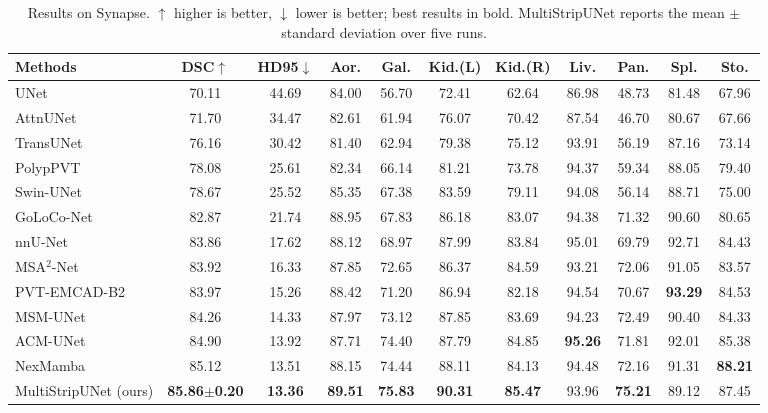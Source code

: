 \documentclass{llncs}
\begin{document}
\begin{table}[!htbp]
\centering
\scriptsize
\caption{Results on Synapse. $\uparrow$ higher is better, $\downarrow$ lower is better; best results in bold. MultiStripUNet reports the mean $\pm$ standard deviation over five runs.}
\label{table1}
\setlength{\tabcolsep}{3.5pt}
\begin{tabular}{l|cc|cccccccc}
\hline
Methods & DSC$\uparrow$ & HD95$\downarrow$ & Aor. & Gal. & Kid.(L) & Kid.(R) & Liv. & Pan. & Spl. & Sto. \\
\hline
UNet         \cite{ronneberger2015unet} & 70.11 & 44.69 & 84.00 & 56.70 & 72.41 & 62.64 & 86.98 & 48.73 & 81.48 & 67.96 \\
AttnUNet     \cite{oktay2018attention}  & 71.70 & 34.47 & 82.61 & 61.94 & 76.07 & 70.42 & 87.54 & 46.70 & 80.67 & 67.66 \\
TransUNet    \cite{chen2021transunet}  & 76.16 & 30.42 & 81.40 & 62.94 & 79.38 & 75.12 & 93.91 & 56.19 & 87.16 & 73.14 \\
PolypPVT     \cite{dong2021polyp}      & 78.08 & 25.61 & 82.34 & 66.14 & 81.21 & 73.78 & 94.37 & 59.34 & 88.05 & 79.40 \\
Swin-UNet    \cite{cao2021swinunet}    & 78.67 & 25.52 & 85.35 & 67.38 & 83.59 & 79.11 & 94.08 & 56.14 & 88.71 & 75.00 \\
GoLoCo-Net   \cite{goloco2026}         & 82.87 & 21.74 & 88.95 & 67.83 & 86.18 & 83.07 & 94.38 & 71.32 & 90.60 & 80.65 \\
nnU-Net      \cite{isensee2021nnu}     & 83.86 & 17.62 & 88.12 & 68.97 & 87.99 & 83.84 & 95.01 & 69.79 & 92.71 & 84.43 \\
MSA$^2$-Net  \cite{msa2net2026}        & 83.92 & 16.33 & 87.85 & 72.65 & 86.37 & 84.59 & 93.21 & 72.06 & 91.05 & 83.57 \\
PVT-EMCAD-B2 \cite{emcad2024}          & 83.97 & 15.26 & 88.42 & 71.20 & 86.94 & 82.18 & 94.54 & 70.67 & \textbf{93.29} & 84.53 \\
MSM-UNet     \cite{msmunet2025}        & 84.26 & 14.33 & 87.97 & 73.12 & 87.85 & 83.69 & 94.23 & 72.49 & 90.40 & 84.33 \\
ACM-UNet     \cite{acmunet2025}        & 84.90 & 13.92 & 87.71 & 74.40 & 87.79 & 84.85 & \textbf{95.26} & 71.81 & 92.01 & 85.38 \\
NexMamba     \cite{nexmamba2026}       & 85.12 & 13.51 & 88.15 & 74.44 & 88.11 & 84.13 & 94.48 & 72.16 & 91.31 & \textbf{88.21} \\
\hline
MultiStripUNet (ours) & \textbf{85.86$\pm$0.20} & \textbf{13.36} & \textbf{89.51} & \textbf{75.83} & \textbf{90.31} & \textbf{85.47} & 93.96 & \textbf{75.21} & 89.12 & 87.45 \\
\hline
\end{tabular}
\end{table}
\end{document}
